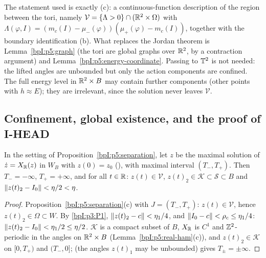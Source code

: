 \begin{remark}\label{bpI:p5:topology-remark}
The statement used is exactly (c): a continuous-function description of the region between the tori, namely $\mathcal V=\{\Lambda>0\}\cap(\mathbb{R}^2\times\Omega)$ with $\Lambda(\varphi,I)=(m_c(I)-\mu_-(\varphi))(\mu_+(\varphi)-m_c(I))$,
together with the boundary identification (b). What replaces the Jordan theorem is Lemma~\ref{bpI:p5:graph} (the tori are global graphs over $\mathbb{R}^2$, by a contraction argument) and Lemma~\ref{bpI:p5:energy-coordinate}.
Passing to $\mathbb{T}^2$ is not needed: the lifted angles are unbounded but only the action components are confined. The full energy level in $\mathbb{R}^2\times B$ may contain further components (other points with $h\approx E$); they are irrelevant, since the solution never leaves $\mathcal V$.
\end{remark}

\subsection{Confinement, global existence, and the proof of I-HEAD}\label{bpI:p5:sec-head}

\begin{proposition}\label{bpI:p5:confinement}
In the setting of Proposition~\ref{bpI:p5:separation}, let $z$ be the maximal solution of $\dot z=X_{\mathbb{R}}(z)$ in $W_B$ with $z(0)=z_0$ (), with maximal interval $(T_-,T_+)$. Then $T_-=-\infty$, $T_+=+\infty$, and for all $t\in\mathbb{R}$: $z(t)\in\mathcal V$, $z(t)_2\in\mathcal K\subset\mathcal S\subset B$ and $\lVert z(t)_2-I_0\rVert<\eta/2<\eta$.
\end{proposition}
\begin{proof}
\label{stepI:p5:cf-conf} Proposition~\ref{bpI:p5:separation}(c) with $J=(T_-,T_+)$: $z(t)\in\mathcal V$, hence $z(t)_2\in\Omega\subset W$. By \ref{bpI:p3:P1}, $\lVert z(t)_2-c\rVert<\eta_1/4$, and $\lVert I_0-c\rVert<\rho_c\le\eta_1/4$: $\lVert z(t)_2-I_0\rVert<\eta_1/2\le\eta/2$.
\label{stepI:p5:cf-cont} $\mathcal K$ is a compact subset of $B$, $X_{\mathbb{R}}$ is $C^1$ and $\mathbb{Z}^2$-periodic in the angles on $\mathbb{R}^2\times B$ (Lemma~\ref{bpI:p5:real-ham}(c)), and $z(t)_2\in\mathcal K$ on $[0,T_+)$ and $(T_-,0]$;  (the angles $z(t)_1$ may be unbounded) gives $T_\pm=\pm\infty$.
\end{proof}

